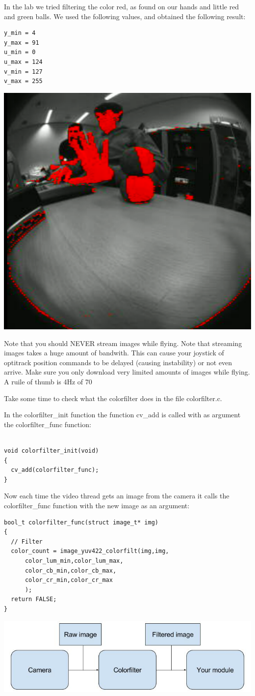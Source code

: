 \documentclass{article}
\begin{document}
In the lab we tried filtering the color red, as found on our hands and little red and green balls. We used the following values, and obtained the following result:
\begin{verbatim}
y_min = 4
y_max = 91
u_min = 0
u_max = 124
v_min = 127
v_max = 255
\end{verbatim}
\includegraphics[width=0.8\linewidth]{filtered}

Note that you should NEVER stream images while flying. Note that streaming images takes a huge amount of bandwith. This can cause your joystick of optitrack position commands to be delayed (causing instability) or not even arrive. Make sure you only download very limited amounts of images while flying. A ruile of thumb is 4Hz of 70%

Take some time to check what the colorfilter does in the file colorfilter.c. 

In the colorfilter\_init function the function cv\_add is called with as argument the colorfilter\_func function:
\begin{verbatim}

void colorfilter_init(void)
{
  cv_add(colorfilter_func);
}

\end{verbatim}
Now each time the video thread gets an image from the camera it calls the colorfilter\_func function with the new image as an argument:
\begin{verbatim}
bool_t colorfilter_func(struct image_t* img)
{
  // Filter
  color_count = image_yuv422_colorfilt(img,img,
      color_lum_min,color_lum_max,
      color_cb_min,color_cb_max,
      color_cr_min,color_cr_max
      );
  return FALSE;
}
\end{verbatim}
\includegraphics[width=0.8\linewidth]{camerafilter}
\end{document}
